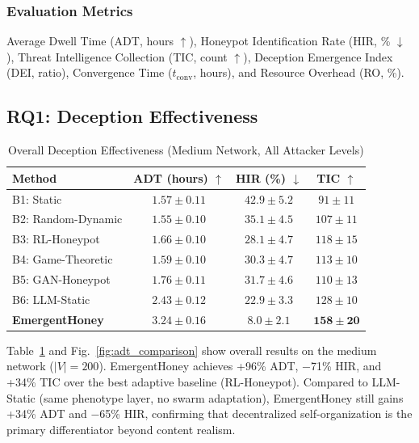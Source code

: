 \documentclass[review,3p,twocolumn]{elsarticle}
\begin{document}
\subsubsection{Evaluation Metrics}

Average Dwell Time (ADT, hours $\uparrow$), Honeypot Identification Rate (HIR, \% $\downarrow$), Threat Intelligence Collection (TIC, count $\uparrow$), Deception Emergence Index (DEI, ratio), Convergence Time ($t_{\mathrm{conv}}$, hours), and Resource Overhead (RO, \%).


\subsection{RQ1: Deception Effectiveness}

\begin{table}[t]
\centering
\caption{Overall Deception Effectiveness (Medium Network, All Attacker Levels)}
\label{tab:rq1}
\small
\begin{tabular}{@{}lccc@{}}
\toprule
\textbf{Method} & \textbf{ADT (hours) $\uparrow$} & \textbf{HIR (\%) $\downarrow$} & \textbf{TIC $\uparrow$} \\
\midrule
B1: Static          & $1.57 \pm 0.11$ & $42.9 \pm 5.2$ & $91 \pm 11$ \\
B2: Random-Dynamic  & $1.55 \pm 0.10$ & $35.1 \pm 4.5$ & $107 \pm 11$ \\
B3: RL-Honeypot     & $1.66 \pm 0.10$ & $28.1 \pm 4.7$ & $118 \pm 15$ \\
B4: Game-Theoretic  & $1.59 \pm 0.10$ & $30.3 \pm 4.7$ & $113 \pm 10$ \\
B5: GAN-Honeypot    & $1.76 \pm 0.11$ & $31.7 \pm 4.6$ & $110 \pm 13$ \\
B6: LLM-Static      & $2.43 \pm 0.12$ & $22.9 \pm 3.3$ & $128 \pm 10$ \\
\textbf{EmergentHoney} & $\mathbf{3.24 \pm 0.16}$ & $\mathbf{8.0 \pm 2.1}$ & $\mathbf{158 \pm 20}$ \\
\bottomrule
\end{tabular}
\end{table}

Table~\ref{tab:rq1} and Fig.~\ref{fig:adt_comparison} show overall results on the medium network ($|V|{=}200$). EmergentHoney achieves +96\% ADT, $-$71\% HIR, and +34\% TIC over the best adaptive baseline (RL-Honeypot). Compared to LLM-Static (same phenotype layer, no swarm adaptation), EmergentHoney still gains +34\% ADT and $-$65\% HIR, confirming that decentralized self-organization is the primary differentiator beyond content realism.
\end{document}
